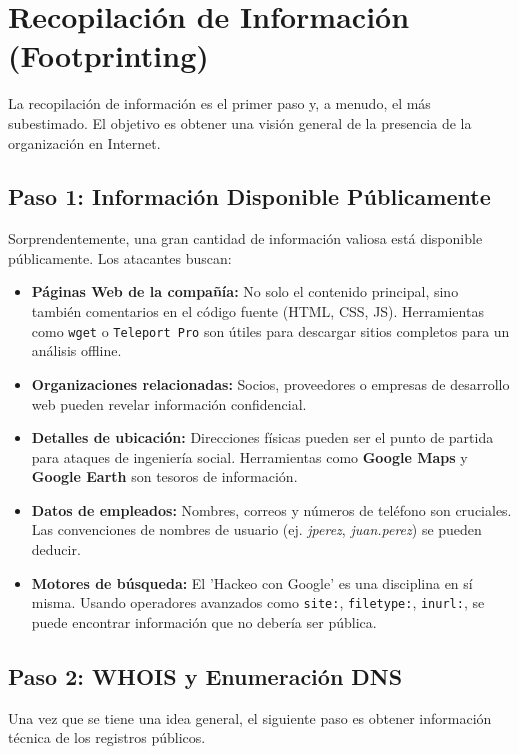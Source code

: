 \documentclass[12pt,a4paper]{article}
\begin{document}
\section{Recopilación de Información (Footprinting)}

La recopilación de información es el primer paso y, a menudo, el más subestimado. El objetivo es obtener una visión general de la presencia de la organización en Internet.

\subsection{Paso 1: Información Disponible Públicamente}

Sorprendentemente, una gran cantidad de información valiosa está disponible públicamente. Los atacantes buscan:
\begin{itemize}
    \item \textbf{Páginas Web de la compañía:} No solo el contenido principal, sino también comentarios en el código fuente (HTML, CSS, JS). Herramientas como \texttt{wget} o \texttt{Teleport Pro} son útiles para descargar sitios completos para un análisis offline.
    \item \textbf{Organizaciones relacionadas:} Socios, proveedores o empresas de desarrollo web pueden revelar información confidencial.
    \item \textbf{Detalles de ubicación:} Direcciones físicas pueden ser el punto de partida para ataques de ingeniería social. Herramientas como \textbf{Google Maps} y \textbf{Google Earth} son tesoros de información.
    \item \textbf{Datos de empleados:} Nombres, correos y números de teléfono son cruciales. Las convenciones de nombres de usuario (ej. \textit{jperez}, \textit{juan.perez}) se pueden deducir.
    \item \textbf{Motores de búsqueda:} El 'Hackeo con Google' es una disciplina en sí misma. Usando operadores avanzados como \texttt{site:}, \texttt{filetype:}, \texttt{inurl:}, se puede encontrar información que no debería ser pública.
\end{itemize}

\subsection{Paso 2: WHOIS y Enumeración DNS}

Una vez que se tiene una idea general, el siguiente paso es obtener información técnica de los registros públicos.
\end{document}
